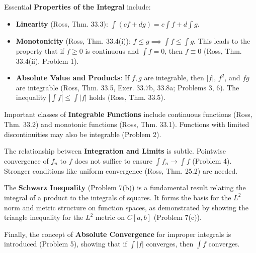 \documentclass{article}
\theoremstyle{definition} %
\theoremstyle{definition} %
\begin{document}
Essential \textbf{Properties of the Integral} include:
\begin{itemize}
    \item \textbf{Linearity} (Ross, Thm. 33.3): $\int (cf+dg) = c\int f + d\int g$.
    \item \textbf{Monotonicity} (Ross, Thm. 33.4(i)): $f \le g \implies \int f \le \int g$. This leads to the property that if $f \ge 0$ is continuous and $\int f = 0$, then $f \equiv 0$ (Ross, Thm. 33.4(ii), Problem 1).
    \item \textbf{Absolute Value and Products}: If $f, g$ are integrable, then $|f|$, $f^2$, and $fg$ are integrable (Ross, Thm. 33.5, Exer. 33.7b, 33.8a; Problems 3, 6). The inequality $|\int f| \le \int |f|$ holds (Ross, Thm. 33.5).
\end{itemize}

Important classes of \textbf{Integrable Functions} include continuous functions (Ross, Thm. 33.2) and monotonic functions (Ross, Thm. 33.1). Functions with limited discontinuities may also be integrable (Problem 2).

The relationship between \textbf{Integration and Limits} is subtle. Pointwise convergence of $f_n$ to $f$ does not suffice to ensure $\int f_n \to \int f$ (Problem 4). Stronger conditions like uniform convergence (Ross, Thm. 25.2) are needed.

The \textbf{Schwarz Inequality} (Problem 7(b)) is a fundamental result relating the integral of a product to the integrals of squares. It forms the basis for the $L^2$ norm and metric structure on function spaces, as demonstrated by showing the triangle inequality for the $L^2$ metric on $C[a,b]$ (Problem 7(c)).

Finally, the concept of \textbf{Absolute Convergence} for improper integrals is introduced (Problem 5), showing that if $\int |f|$ converges, then $\int f$ converges.
\end{document}
